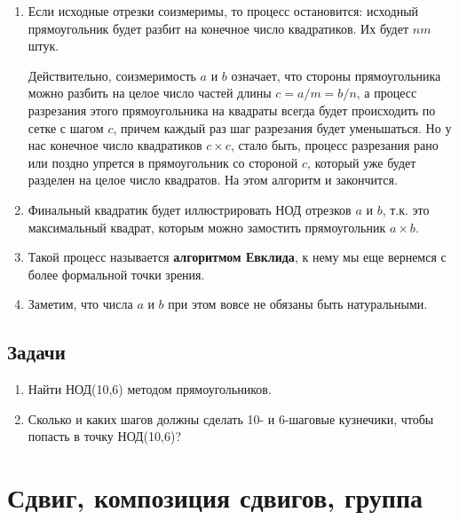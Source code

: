 \begin{enumerate}
\item Если исходные отрезки соизмеримы, то процесс остановится: исходный прямоугольник будет разбит на конечное число квадратиков. Их будет $nm$ штук.

Действительно, соизмеримость $a$ и $b$ означает, что стороны прямоугольника можно разбить на целое число частей длины $c=a/m=b/n$, а процесс разрезания этого прямоугольника на квадраты всегда будет происходить по сетке с шагом $c$, причем каждый раз шаг разрезания будет уменьшаться. Но у нас конечное число квадратиков $c\times c$, стало быть, процесс разрезания рано или поздно упрется в прямоугольник со стороной $c$, который уже будет разделен на целое число квадратов. На этом алгоритм и закончится.

\item Финальный квадратик будет иллюстрировать НОД отрезков $a$ и $b$, т.к. это максимальный квадрат, которым можно замостить прямоугольник $a\times b$.
\item Такой процесс называется \textbf{алгоритмом Евклида}, к нему мы еще вернемся с более формальной точки зрения.
\item Заметим, что числа $a$ и $b$ при этом вовсе не обязаны быть натуральными.
\end{enumerate}
\subsection*{Задачи}
\begin{enumerate}
\item Найти НОД(10,6) методом прямоугольников.
\item Сколько и каких шагов должны сделать 10- и 6-шаговые кузнечики, чтобы попасть в точку НОД(10,6)?
\end{enumerate}





\section{Сдвиг, композиция сдвигов, группа}

